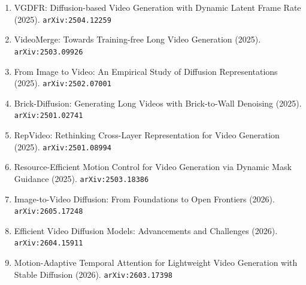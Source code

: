 \documentclass[11pt]{article}
\begin{document}
\begin{enumerate}
  \item VGDFR: Diffusion-based Video Generation with Dynamic Latent Frame Rate (2025). \texttt{arXiv:2504.12259}
  \item VideoMerge: Towards Training-free Long Video Generation (2025). \texttt{arXiv:2503.09926}
  \item From Image to Video: An Empirical Study of Diffusion Representations (2025). \texttt{arXiv:2502.07001}
  \item Brick-Diffusion: Generating Long Videos with Brick-to-Wall Denoising (2025). \texttt{arXiv:2501.02741}
  \item RepVideo: Rethinking Cross-Layer Representation for Video Generation (2025). \texttt{arXiv:2501.08994}
  \item Resource-Efficient Motion Control for Video Generation via Dynamic Mask
  Guidance (2025). \texttt{arXiv:2503.18386}
  \item Image-to-Video Diffusion: From Foundations to Open Frontiers (2026). \texttt{arXiv:2605.17248}
  \item Efficient Video Diffusion Models: Advancements and Challenges (2026). \texttt{arXiv:2604.15911}
  \item Motion-Adaptive Temporal Attention for Lightweight Video Generation with Stable Diffusion (2026). \texttt{arXiv:2603.17398}
\end{enumerate}
\end{document}
